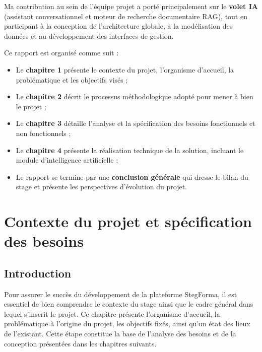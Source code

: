 \documentclass[12pt,a4paper]{report}
\begin{document}
Ma contribution au sein de l'équipe projet a porté principalement sur le \textbf{volet IA} (assistant conversationnel et moteur de recherche documentaire RAG), tout en participant à la conception de l'architecture globale, à la modélisation des données et au développement des interfaces de gestion.

Ce rapport est organisé comme suit :
\begin{itemize}[label=\textbullet]
    \item Le \textbf{chapitre 1} présente le contexte du projet, l'organisme d'accueil, la problématique et les objectifs visés ;
    \item Le \textbf{chapitre 2} décrit le processus méthodologique adopté pour mener à bien le projet ;
    \item Le \textbf{chapitre 3} détaille l'analyse et la spécification des besoins fonctionnels et non fonctionnels ;
    \item Le \textbf{chapitre 4} présente la réalisation technique de la solution, incluant le module d'intelligence artificielle ;
    \item Le rapport se termine par une \textbf{conclusion générale} qui dresse le bilan du stage et présente les perspectives d'évolution du projet.
\end{itemize}

\chapter[Contexte du projet]{Contexte du projet et spécification des besoins}

\section*{Introduction}
\hrulefill

Pour assurer le succès du développement de la plateforme StegForma, il est essentiel de bien comprendre le contexte du stage ainsi que le cadre général dans lequel s'inscrit le projet. Ce chapitre présente l'organisme d'accueil, la problématique à l'origine du projet, les objectifs fixés, ainsi qu'un état des lieux de l'existant. Cette étape constitue la base de l'analyse des besoins et de la conception présentées dans les chapitres suivants.

\end{document}

